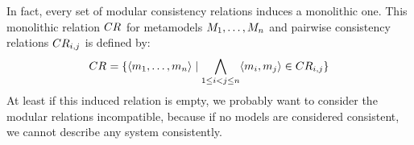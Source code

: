 In fact, every set of modular consistency relations induces a monolithic one.
This monolithic relation $CR_{}$ for metamodels $M_{1}, \dots, M_{n}$ and pairwise consistency relations $CR_{i,j}$ is defined by:
\begin{align*}
    CR_{} = \{ \langle m_{1}, \dots, m_{n} \rangle \mid \bigwedge\limits_{1 \le i < j \le n} \langle m_{i}, m_{j} \rangle \in CR_{i,j} \}
\end{align*}
At least if this induced relation is empty, we probably want to consider the modular relations incompatible, because if no models are considered consistent, we cannot describe any system consistently.





